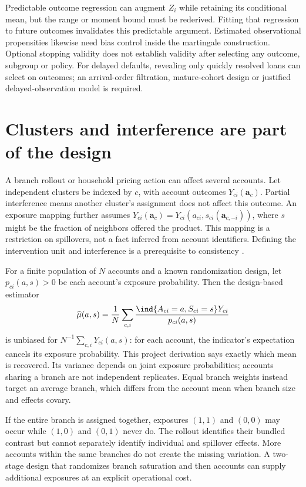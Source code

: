 Predictable outcome regression can augment $Z_i$ while retaining its
conditional mean, but the range or moment bound must be rederived.
Fitting that regression to future outcomes invalidates this predictable
argument. Estimated observational propensities likewise need bias
control inside the martingale construction. Optional stopping validity
does not establish validity after selecting any outcome, subgroup or
policy. For delayed defaults, revealing only quickly resolved loans
can select on outcomes; an arrival-order filtration, mature-cohort
design or justified delayed-observation model is required.

\section{Clusters and interference are part of the design}
\label{r3:interference}
A branch rollout or household pricing action can affect several
accounts. Let independent clusters be indexed by $c$, with account
outcomes $Y_{ci}(\mathbf a_c)$. Partial interference means another
cluster's assignment does not affect this outcome. An exposure mapping
further assumes
$Y_{ci}(\mathbf a_c)=Y_{ci}(a_{ci},s_{ci}(\mathbf a_{c,-i}))$,
where $s$ might be the fraction of neighbors offered the product.
This mapping is a restriction on spillovers, not a fact inferred from
account identifiers. Defining the intervention unit and interference
is a prerequisite to consistency \citep[Fine Point 1.1]{hernan2020}.

For a finite population of $N$ accounts and a known randomization
design, let $p_{ci}(a,s)>0$ be each account's exposure probability.
Then the design-based estimator
\[
 \widehat\mu(a,s)=\frac1N\sum_{c,i}
 \frac{\ind\{A_{ci}=a,S_{ci}=s\}Y_{ci}}{p_{ci}(a,s)}
\]
is unbiased for $N^{-1}\sum_{c,i}Y_{ci}(a,s)$: for each account,
the indicator's expectation cancels its exposure probability. This
project derivation says exactly which mean is recovered. Its variance
depends on joint exposure probabilities; accounts sharing a branch
are not independent replicates. Equal branch weights instead target
an average branch, which differs from the account mean when branch
size and effects covary.

If the entire branch is assigned together, exposures $(1,1)$ and
$(0,0)$ may occur while $(1,0)$ and $(0,1)$ never do. The rollout
identifies their bundled contrast but cannot separately identify
individual and spillover effects. More accounts within the same
branches do not create the missing variation. A two-stage design
that randomizes branch saturation and then accounts can supply
additional exposures at an explicit operational cost.

